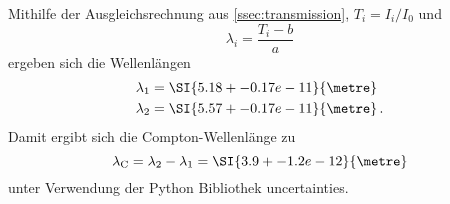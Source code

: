 Mithilfe der Ausgleichsrechnung aus \autoref{ssec:transmission}, $T_i=I_i/I_0$ und
\begin{equation}
    \lambda_i = \frac{T_i - b}{a}
\end{equation}
ergeben sich die Wellenlängen
\begin{align*}
    \lambda_1 &= \SI{5.18+-0.17e-11}{\metre} \\
    \lambda_2 &= \SI{5.57+-0.17e-11}{\metre} \,.
\end{align*}
Damit ergibt sich die Compton-Wellenlänge zu
\begin{equation*}
    \lambda_\text{C} = \lambda_2 - \lambda_1 = \SI{3.9+-1.2e-12}{\metre}
\end{equation*}
unter Verwendung der Python Bibliothek uncertainties.\cite{uncertainties}